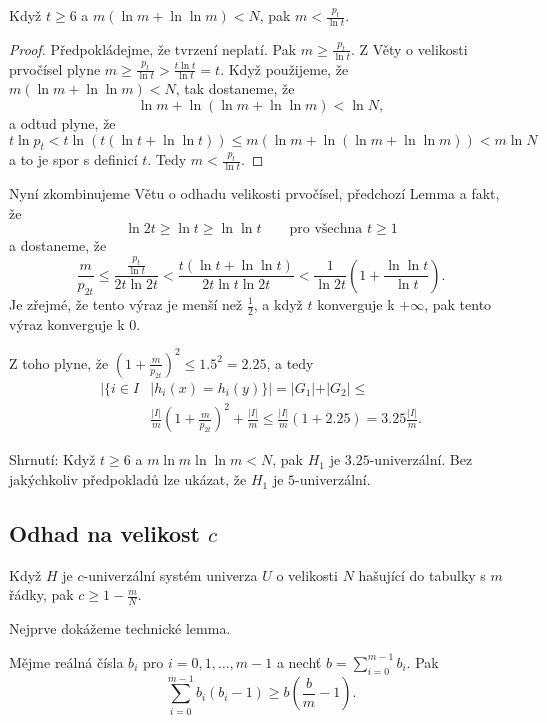 \documentclass[a4paper,12pt]{article}
\begin{document}
\begin{lemma}Když $t\ge 6$ a $m(\ln m+\ln\ln m)<N$, pak $m<\frac {
p_t}{\ln t}$.
\end{lemma}

\begin{proof}Předpokládejme, že tvrzení neplatí. Pak $
m\ge\frac {p_t}{\ln t}$. Z Věty o velikosti 
prvo\-čí\-sel plyne $m\ge\frac {p_t}{\ln t}>\frac {t\ln 
t}{\ln t}=t$. Když použijeme, že 
$m(\ln m+\ln\ln m)<N$, tak dostaneme, že 
$$\ln m+\ln(\ln m+\ln\ln m)<\ln N,$$
a odtud plyne, že 
$$t\ln p_t<t\ln(t(\ln t+\ln\ln t))\le m(\ln m+\ln(\ln m+\ln\ln m)
)<m\ln N$$
a to je spor s definicí $t$. Tedy $m<\frac {p_t}{\ln t}$.
\end{proof}

Nyní zkombinujeme Větu o odhadu velikosti prvočísel, 
před\-cho\-zí Lemma a fakt, že 
$$\ln2t\ge\ln t\ge\ln\ln t\qquad\text{pro všechna }t\ge 1$$
a dostaneme, že
$$\frac m{p_{2t}}\le\frac {\frac {p_t}{\ln t}}{2t\ln2t}<\frac {t(\ln 
t+\ln\ln t)}{2t\ln t\ln2t}<\frac 1{\ln2t}(1+\frac {\ln\ln t}{\ln 
t}).$$
Je zřejmé, že tento výraz je menší než $\frac 
12$, 
a když $t$ konverguje k $+\infty$, pak tento výraz konverguje k $
0$.

Z toho plyne, že $(1+\frac m{p_{2t}})^2\le 1.5^2=2.2
5$, a tedy 
\begin{align*}|\{i\in I&\mid h_i(x)=h_i(y)\}|=|G_1|+|G_2|\le\\
&\frac {|I|}m(1+\frac m{p_{2t}})^2+\frac {|I|}m\le\frac {|I|}m(1+
2.25)=3.25\frac {|I|}m.\end{align*}

Shrnutí: Když $t\ge 6$ a $m\ln m\ln\ln m<N$, pak $
H_1$ je 
$3.25$-univerzální. Bez jakýchkoliv předpokladů lze 
ukázat, že $H_1$ je $5$-univerzální.

\subsection{
Odhad na velikost $c$
}

\begin{veta}Když $H$ je $c$-univerzální 
systém univerza $U$ o velikosti $N$ hašující do tabulky s $
m$ řádky, 
pak $c\ge 1-\frac mN$.
\end{veta}

Nejprve dokážeme technické lemma.

\begin{lemma}Mějme reálná čísla $b_i$ pro $i=0,1
,\dots,m-1$ a 
nechť $b=\sum_{i=0}^{m-1}b_i$. Pak 
$$\sum_{i=0}^{m-1}b_i(b_i-1)\ge b(\frac bm-1).$$
\end{lemma}
\end{document}
